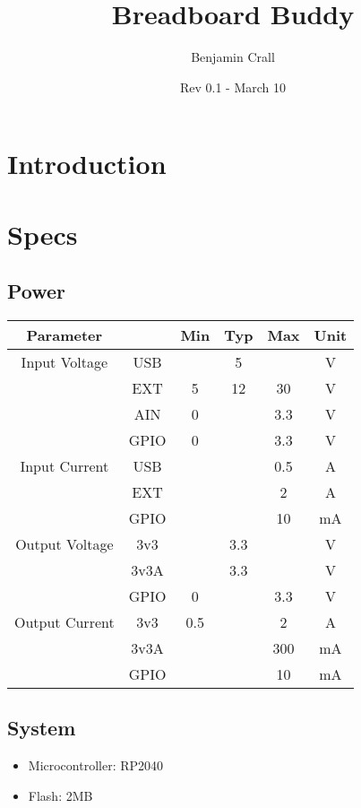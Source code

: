 \documentclass[12pt,letterpaper]{article}
\title{\huge Breadboard Buddy}
\author{{\Large Benjamin Crall}}
\date{Rev 0.1 - March 10}
\begin{document}
\maketitle

\section{Introduction}

\section{Specs}

\subsection{Power}
\begin{table}[H]
    \centering
    \begin{tabular}{|cc|c|c|c|c|}\hline
        Parameter      &      & Min & Typ & Max & Unit \\\hline
        Input Voltage  & USB  &     & 5   &     & V    \\
                       & EXT  & 5   & 12  & 30  & V    \\
                       & AIN  & 0   &     & 3.3 & V    \\
                       & GPIO & 0   &     & 3.3 & V    \\\hline
        Input Current  & USB  &     &     & 0.5 & A    \\
                       & EXT  &     &     & 2   & A    \\
                       & GPIO &     &     & 10  & mA   \\\hline
        Output Voltage & 3v3  &     & 3.3 &     & V    \\
                       & 3v3A &     & 3.3 &     & V    \\
                       & GPIO & 0   &     & 3.3 & V    \\\hline
        Output Current & 3v3  & 0.5 &     & 2   & A    \\
                       & 3v3A &     &     & 300 & mA   \\
                       & GPIO &     &     & 10  & mA   \\\hline
    \end{tabular}
\end{table}

\subsection{System}
\begin{itemize}
    \item Microcontroller: RP2040
    \item Flash: 2MB
\end{itemize}
\end{document}
